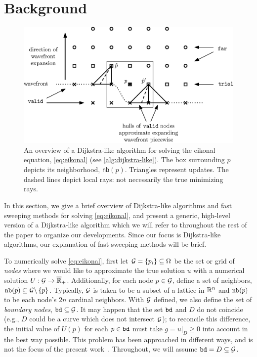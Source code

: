 \documentclass[eikonal.tex]{subfiles}
\begin{document}
\section{Background}\label{sec:background}

\begin{figure}[t]
  \centering
  \includegraphics{overview.eps}
  \caption{An overview of a Dijkstra-like algorithm for solving the
    eikonal equation, \cref{eq:eikonal} (see
    \cref{alg:dijkstra-like}). The box surrounding $p$ depicts its
    neighborhood, \texttt{nb}$(p)$. Triangles represent updates. The
    dashed lines depict local rays: not necessarily the true
    minimizing rays.}
  \label{fig:overview}
\end{figure}

In this section, we give a brief overview of Dijkstra-like algorithms
and fast sweeping methods for solving \cref{eq:eikonal}, and present a
generic, high-level version of a Dijkstra-like algorithm which we will
refer to throughout the rest of the paper to organize our
developments. Since our focus is Dijkstra-like algorithms, our
explanation of fast sweeping methods will be brief.

To numerically solve \cref{eq:eikonal}, first let
$\mathcal{G} = \{p_i\} \subseteq \Omega$ be the set or grid of \emph{nodes}
where we would like to approximate the true solution $u$ with a
numerical solution $U : \mathcal{G} \to
\overline{\mathbb{R}}_+$. Additionally, for each node $p \in \mathcal{G}$,
define a set of neighbors,
$\texttt{nb}(p) \subseteq \mathcal{G} \backslash \left\{p\right\}$. Typically, $\mathcal{G}$ is
taken to be a subset of a lattice in $\mathbb{R}^n$ and $\texttt{nb}(p)$ to be each
node's $2n$ cardinal neighbors. With $\mathcal{G}$ defined, we also define
the set of \emph{boundary nodes}, $\texttt{bd} \subseteq \mathcal{G}$. It may
happen that the set $\texttt{bd}$ and $D$ do not coincide (e.g., $D$
could be a curve which does not intersect $\mathcal{G}$); to reconcile this
difference, the initial value of $U(p)$ for each $p \in \texttt{bd}$
must take $g = \left. u \right|_D \geq 0$ into account in the best way
possible. This problem has been approached in different ways, and is
not the focus of the present work~\cite{chopp2001some}. Throughout, we
will assume $\texttt{bd} = D \subseteq \mathcal{G}$.
\end{document}
